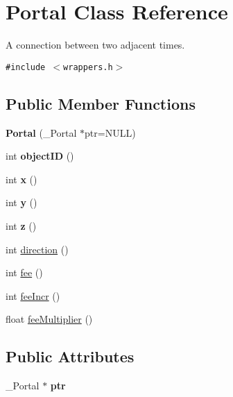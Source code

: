 \hypertarget{classPortal}{
\section{Portal Class Reference}
\label{classPortal}
}
A connection between two adjacent times.  


{\tt \#include $<$wrappers.h$>$}

\subsection*{Public Member Functions}
\begin{CompactItemize}
\item 
\hypertarget{classPortal_8f5c96f6f21a615d927226f2f28d9f8c}{
\textbf{Portal} (\_\-Portal $\ast$ptr=NULL)}
\label{classPortal_8f5c96f6f21a615d927226f2f28d9f8c}

\item 
\hypertarget{classPortal_869c273a06786f357952d40ce1969621}{
int \textbf{objectID} ()}
\label{classPortal_869c273a06786f357952d40ce1969621}

\item 
\hypertarget{classPortal_3b938a6423a8364de73152f17039f4b5}{
int \textbf{x} ()}
\label{classPortal_3b938a6423a8364de73152f17039f4b5}

\item 
\hypertarget{classPortal_6c466715c6a351d1f1d82272bf1ae6bf}{
int \textbf{y} ()}
\label{classPortal_6c466715c6a351d1f1d82272bf1ae6bf}

\item 
\hypertarget{classPortal_532fa14323151a5a1b4527d37e6a3ae1}{
int \textbf{z} ()}
\label{classPortal_532fa14323151a5a1b4527d37e6a3ae1}

\item 
int \hyperlink{classPortal_07b79572705192e018631324017cfad7}{direction} ()
\item 
int \hyperlink{classPortal_9b8b1eef151f135157295e00b09fe9c5}{fee} ()
\item 
int \hyperlink{classPortal_3ef4c98143afeb453f17d6aba763ad1d}{feeIncr} ()
\item 
float \hyperlink{classPortal_64b431284d20f1d04a3f9a4192482f5d}{feeMultiplier} ()
\end{CompactItemize}
\subsection*{Public Attributes}
\begin{CompactItemize}
\item 
\hypertarget{classPortal_1259664a539998b39f9c5028474e5a7a}{
\_\-Portal $\ast$ \textbf{ptr}}
\label{classPortal_1259664a539998b39f9c5028474e5a7a}

\end{CompactItemize}
